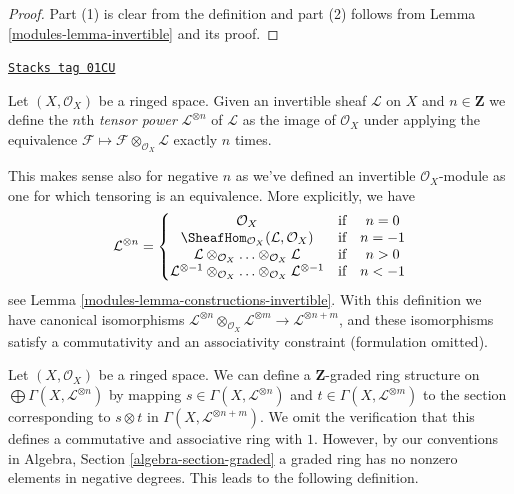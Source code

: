 \begin{proof}

Part (1) is clear from the definition and part (2) follows from
Lemma \ref{modules-lemma-invertible} and its proof.
\end{proof}

\begin{definition}[Powers]
\label{modules-definition-powers}
\href{https://stacks.math.columbia.edu/tag/01CU}{\texttt{Stacks tag 01CU}}

Let $(X, \mathcal{O}_X)$ be a ringed space. Given an invertible sheaf
$\mathcal{L}$ on $X$ and $n \in \mathbf{Z}$ we define the
$n$th {\it tensor power} $\mathcal{L}^{\otimes n}$ of $\mathcal{L}$
as the image of $\mathcal{O}_X$ under applying the equivalence
$\mathcal{F} \mapsto\mathcal{F} \otimes_{\mathcal{O}_X} \mathcal{L}$
exactly $n$ times.
\end{definition}

This makes sense also for negative $n$ as we've defined an invertible
$\mathcal{O}_X$-module as one for which tensoring is an equivalence.
More explicitly, we have
$$
\mathcal{L}^{\otimes n} =
\left\{
\begin{matrix}
\mathcal{O}_X & \text{if} & n = 0 \\
\SheafHom_{\mathcal{O}_X}(\mathcal{L}, \mathcal{O}_X) & \text{if} & n = -1\\
\mathcal{L} \otimes_{\mathcal{O}_X} \ldots \otimes_{\mathcal{O}_X} \mathcal{L}
& \text{if} & n > 0 \\
\mathcal{L}^{\otimes -1} \otimes_{\mathcal{O}_X} \ldots
\otimes_{\mathcal{O}_X} \mathcal{L}^{\otimes -1}
& \text{if} & n < -1
\end{matrix}
\right.
$$
see Lemma \ref{modules-lemma-constructions-invertible}.
With this definition we have canonical isomorphisms
$\mathcal{L}^{\otimes n} \otimes_{\mathcal{O}_X}
\mathcal{L}^{\otimes m} \to
\mathcal{L}^{\otimes n + m}$, and these isomorphisms
satisfy a commutativity and an associativity constraint
(formulation omitted).

\medskip\noindent
Let $(X, \mathcal{O}_X)$ be a ringed space. We can define a $\mathbf{Z}$-graded
ring structure on $\bigoplus \Gamma(X, \mathcal{L}^{\otimes n})$ by mapping
$s \in \Gamma(X, \mathcal{L}^{\otimes n})$ and
$t \in \Gamma(X, \mathcal{L}^{\otimes m})$ to the
section corresponding to $s \otimes t$ in
$\Gamma(X, \mathcal{L}^{\otimes n + m})$.
We omit the verification that this defines a commutative
and associative ring with $1$. However, by our conventions in
Algebra, Section \ref{algebra-section-graded}
a graded ring has no nonzero elements in negative degrees.
This leads to the following definition.

